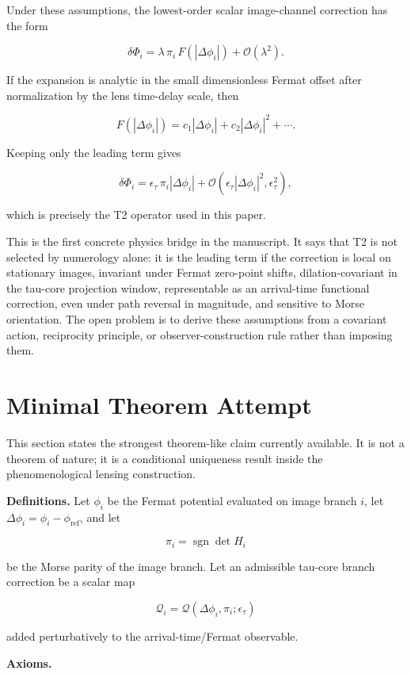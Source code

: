 \documentclass[11pt]{article}
\begin{document}
Under these assumptions, the lowest-order scalar image-channel
correction has the form

\[
\delta\Phi_i
=
\lambda\,\pi_i\,F(|\Delta\phi_i|)
+ \mathcal{O}(\lambda^2).
\]

If the expansion is analytic in the small dimensionless Fermat offset
after normalization by the lens time-delay scale, then

\[
F(|\Delta\phi_i|)
=
c_1|\Delta\phi_i|
+ c_2|\Delta\phi_i|^2
+ \cdots .
\]

Keeping only the leading term gives

\[
\delta\Phi_i
=
\epsilon_\tau\,\pi_i|\Delta\phi_i|
+ \mathcal{O}(\epsilon_\tau |\Delta\phi_i|^2,\epsilon_\tau^2),
\]

which is precisely the T2 operator used in this paper.

This is the first concrete physics bridge in the manuscript. It says
that T2 is not selected by numerology alone: it is the leading term if
the correction is local on stationary images, invariant under Fermat
zero-point shifts, dilation-covariant in the tau-core projection window,
representable as an arrival-time functional correction, even under path
reversal in magnitude, and sensitive to Morse orientation. The open
problem is to derive these assumptions from a covariant action,
reciprocity principle, or observer-construction rule rather than
imposing them.

\section{Minimal Theorem Attempt}\label{minimal-theorem-attempt}

This section states the strongest theorem-like claim currently
available. It is not a theorem of nature; it is a conditional uniqueness
result inside the phenomenological lensing construction.

\textbf{Definitions.} Let \(\phi_i\) be the Fermat potential evaluated
on image branch \(i\), let \(\Delta\phi_i=\phi_i-\phi_\mathrm{ref}\),
and let

\[
\pi_i=\operatorname{sgn}\det H_i
\]

be the Morse parity of the image branch. Let an admissible tau-core
branch correction be a scalar map

\[
\mathcal{Q}_i
=
\mathcal{Q}(\Delta\phi_i,\pi_i;\epsilon_\tau)
\]

added perturbatively to the arrival-time/Fermat observable.

\textbf{Axioms.}
\end{document}
